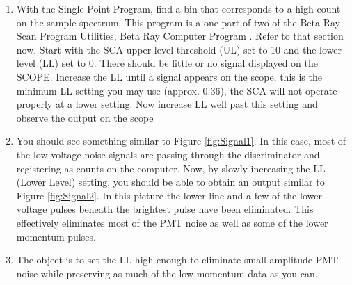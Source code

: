 \documentclass{../lab}
\begin{document}
\begin{enumerate}
    \item With the Single Point Program, find a bin that corresponds to a high count on the sample spectrum. This program is a one part of two of the Beta Ray Scan Program Utilities, Beta Ray Computer Program \cite{Krane}. Refer to that section now. Start with the SCA upper-level threshold (UL) set to 10 and the lower-level (LL) set to 0. There should be little or no signal displayed on the SCOPE. Increase the LL until a signal appears on the scope, this is the minimum LL setting you may use (approx. 0.36), the SCA will not operate properly at a lower setting. Now increase LL well past this setting and observe the output on the scope

    \item You should see something similar to Figure \ref{fig:Signal1}. In this case, most of the low voltage noise signals are passing through the discriminator and registering as counts on the computer. Now, by slowly increasing the LL (Lower Level) setting, you should be able to obtain an output similar to Figure \ref{fig:Signal2}. In this picture the lower line and a few of the lower voltage pulses beneath the brightest pulse have been eliminated. This effectively eliminates most of the PMT noise as well as some of the lower momentum pulses.
    
    

    \item The object is to set the LL high enough to eliminate small-amplitude PMT noise while preserving as much of the low-momentum data as you can.


\end{enumerate}
\end{document}
